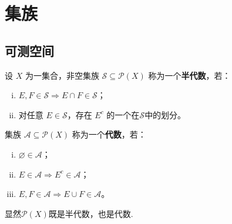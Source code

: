 \documentclass[../../main.tex]{subfiles}%
\begin{document}
\section{集族}\label{section:ch01-集族}

\subsection{可测空间}\label{subsection:ch01-可测空间}

\begin{definition}\label{definition:ch01-半代数代数}
设 $X$ 为一集合，非空集族 $\mathcal{S}\subseteq\mathcal{P}(X)$ 称为一个\textbf{半代数}，若：
\begin{enumerate}[(i)]
\item $E,F\in\mathcal{S}\Rightarrow E\cap F\in\mathcal{S}$；
\item 对任意 $E\in\mathcal{S}$，存在 $E^c$ 的一个在$\mathcal{S}$中的划分。
\end{enumerate}
集族 $\mathcal{A}\subseteq\mathcal{P}(X)$ 称为一个\textbf{代数}，若：
\begin{enumerate}[(i)]
\item $\varnothing \in\mathcal{A}$；
\item $E\in\mathcal{A}\Rightarrow E^c\in\mathcal{A}$；
\item $E,F\in\mathcal{A}\Rightarrow E\cup F\in\mathcal{A}$。
\end{enumerate}
\end{definition}
\begin{remark}
显然$\mathcal{P}(X)$既是半代数，也是代数.
\end{remark}
\end{document}
